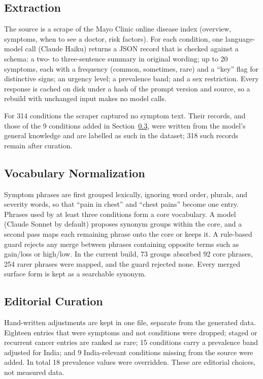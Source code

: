 \documentclass[conference]{IEEEtran}
\begin{document}
\subsection{Extraction}

The source is a scrape of the Mayo Clinic online disease index (overview, symptoms, when to see a doctor, risk factors). For each condition, one language-model call (Claude Haiku) returns a JSON record that is checked against a schema: a two- to three-sentence summary in original wording; up to 20 symptoms, each with a frequency (common, sometimes, rare) and a ``key'' flag for distinctive signs; an urgency level; a prevalence band; and a sex restriction. Every response is cached on disk under a hash of the prompt version and source, so a rebuild with unchanged input makes no model calls.

For 314 conditions the scraper captured no symptom text. Their records, and those of the 9 conditions added in Section~\ref{sec:curation}, were written from the model's general knowledge and are labelled as such in the dataset; 318 such records remain after curation.

\subsection{Vocabulary Normalization}

Symptom phrases are first grouped lexically, ignoring word order, plurals, and severity words, so that ``pain in chest'' and ``chest pains'' become one entry. Phrases used by at least three conditions form a core vocabulary. A model (Claude Sonnet by default) proposes synonym groups within the core, and a second pass maps each remaining phrase onto the core or keeps it. A rule-based guard rejects any merge between phrases containing opposite terms such as gain/loss or high/low. In the current build, 73 groups absorbed 92 core phrases, 254 rarer phrases were mapped, and the guard rejected none. Every merged surface form is kept as a searchable synonym.

\subsection{Editorial Curation}
\label{sec:curation}

Hand-written adjustments are kept in one file, separate from the generated data. Eighteen entries that were symptoms and not conditions were dropped; staged or recurrent cancer entries are ranked as rare; 15 conditions carry a prevalence band adjusted for India; and 9 India-relevant conditions missing from the source were added. In total 18 prevalence values were overridden. These are editorial choices, not measured data.
\end{document}
